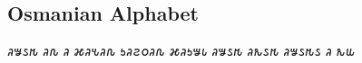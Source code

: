 \subsection{Osmanian Alphabet}

\bgroup
\newfontfamily{}
\osmanian
𐒚𐒁𐒖𐒄 𐒚𐒐 𐒚 𐒎𐒚𐒍𐒚𐒐 𐒑𐒚𐒒𐒠𐒚𐒐 𐒎𐒚𐒑𐒁𐒗 𐒚𐒁𐒖𐒄 𐒚𐒌𐒖𐒄 𐒚𐒁𐒖𐒄𐒖 𐒚
𐒌𐒜
\egroup